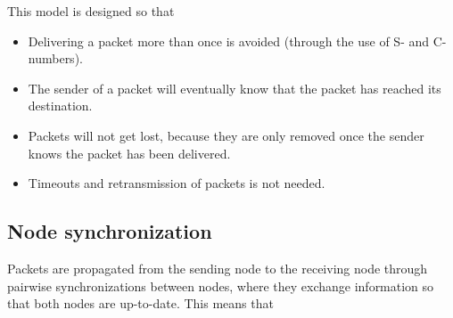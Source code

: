 \documentclass{article}
\begin{document}
This model is designed so that
\begin{itemize}
  \item Delivering a packet more than once is avoided (through the use of S- and C-numbers).
  \item The sender of a packet will eventually know that the packet has reached its destination.
  \item Packets will not get lost, because they are only removed once the sender knows the packet has been delivered.
  \item Timeouts and retransmission of packets is not needed.
\end{itemize}

\subsection{Node synchronization}
Packets are propagated from the sending node to the receiving node through pairwise synchronizations between nodes, where they exchange information so that both nodes are up-to-date. This means that
\end{document}
